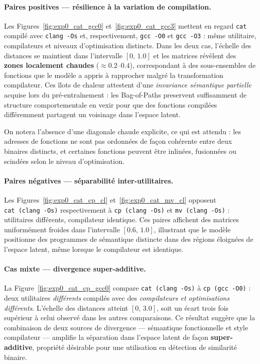 \paragraph{Paires positives — résilience à la variation de compilation.}
Les Figures~\ref{fig:exp0_cat_gcc0} et~\ref{fig:exp0_cat_gcc3} mettent en
regard \texttt{cat} compilé avec \texttt{clang~-Os} et, respectivement,
\texttt{gcc~-O0} et \texttt{gcc~-O3} : même utilitaire, compilateurs et
niveaux d'optimisation distincts. Dans les deux cas, l'échelle des distances
se maintient dans l'intervalle $[0,\,1.0]$ et les matrices révèlent des
\textbf{zones localement chaudes} ($\approx 0.2$--$0.4$), correspondant à des
sous-ensembles de fonctions que le modèle a appris à rapprocher malgré la
transformation compilateur. Ces îlots de chaleur attestent d'une
\emph{invariance sémantique partielle} acquise lors du pré-entraînement : les
Bag-of-Paths preservent suffisamment de structure comportementale en
\gls{vexir} pour que des fonctions compilées différemment partagent un
voisinage dans l'espace latent.

On notera l'absence d'une diagonale chaude explicite, ce qui est attendu :
les adresses de fonctions ne sont pas ordonnées de façon cohérente entre deux
binaires distincts, et certaines fonctions peuvent être inlinées, fusionnées
ou scindées selon le niveau d'optimisation.

\paragraph{Paires négatives — séparabilité inter-utilitaires.}
Les Figures~\ref{fig:exp0_cat_cp_cl} et~\ref{fig:exp0_cat_mv_cl} opposent
\texttt{cat~(clang~-Os)} respectivement à \texttt{cp~(clang~-Os)} et
\texttt{mv~(clang~-Os)} : utilitaires différents, compilateur identique. Ces
paires affichent des matrices uniformément froides dans l'intervalle $[0.6,\,
1.0]$, illustrant que le modèle positionne des programmes de sémantique
distincte dans des régions éloignées de l'espace latent, même lorsque le
compilateur est identique.

\paragraph{Cas mixte — divergence super-additive.}
La Figure~\ref{fig:exp0_cat_cp_gcc0} compare \texttt{cat~(clang~-Os)} à
\texttt{cp~(gcc~-O0)} : deux utilitaires \emph{différents} compilés avec des
\emph{compilateurs et optimisations différents}. L'échelle des distances atteint
$[0,\,3.0]$, soit un écart trois fois supérieur à celui observé dans les autres
comparaisons. Ce résultat suggère que la combinaison de deux sources de
divergence — sémantique fonctionnelle et style compilateur — amplifie la
séparation dans l'espace latent de façon \textbf{super-additive}, propriété
désirable pour une utilisation en détection de similarité binaire.

